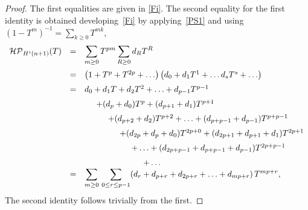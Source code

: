 \documentclass[11pt,a4paper,times]{amsart}
\theoremstyle{plain}
\theoremstyle{definition}
\numberwithin{equation}{section}
\newcommand{\ds}{\displaystyle}
\newcommand{\dsum}{\ds\sum}
\newcommand{\eqskip}{ \vspace*{2mm}\\ }
\begin{document}
{\begin{proof}
The first equalities are given in  \eqref{Fi}.
 The second equality for the first identity is obtained developing~\eqref{Fi} by applying~\eqref{PS1} and using
 $(1-T^m)^{-1}=\dsum_{k\geq 0}T^{mk}$,
\[
 \begin{array}{lll}
\mathcal{HP}_{H^i(n+1)}(T) & = & \dsum_{m\geq 0}T^{pm}\sum_{R\geq 0}d_RT^R\eqskip
& = & \left(1+ T^p+ T^{2p}+\ldots\right)\left(d_0 +d_1T^1+ \ldots d_{s}T^{s}+\ldots \right)\eqskip
& = & d_0+d_1T+d_2T^2+\ldots + d_{p-1}T^{p-1}\eqskip
& & \hspace*{5mm} + (d_p+d_0)T^p +(d_{p+1}+d_1)T^{p+1}\eqskip
& & \hspace*{10mm}+ (d_{p+2}+d_2)T^{p+2}+\ldots + (d_{p+p-1} +d_{p-1})T^{p+p-1}\eqskip
& & \hspace*{15mm}+ (d_{2p}+d_{p}+d_0)T^{2p+0}
+ (d_{2p+1}+d_{p+1}+d_1)T^{2p+1}\eqskip
& & \hspace*{20mm}+\ldots+ (d_{2p+p-1} +d_{p+p-1}+ d_{p-1})T^{2p+p-1}\eqskip
& &  \hspace*{25mm}+ \ldots\\
&=& \dsum_{m\geq 0}\, \dsum_{0\leq r\leq p-1}(d_r+ d_{p+r}+ d_{2p+r}+\ldots+d_{mp+r})\,
T^{mp+r},
\end{array}
\]
The second identity follows trivially from the first.
\end{proof}

}
\end{document}

